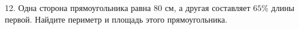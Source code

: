 12. Одна сторона прямоугольника равна 80 см, а другая составляет $65\%$ длины первой. Найдите периметр и площадь этого прямоугольника.\\
